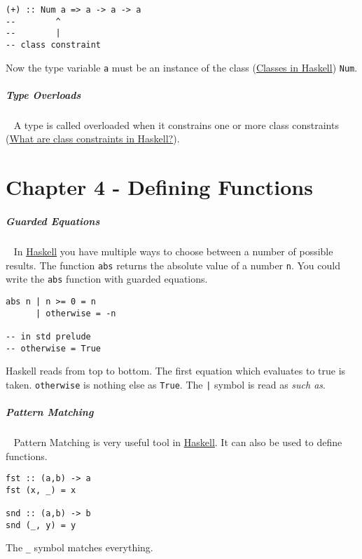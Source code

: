 \documentclass[11pt,twoside,landscape]{article}
\begin{document}
\begin{multicols}{3}
\lstset{language=haskell,label= ,caption= ,captionpos=b,numbers=none}
\begin{lstlisting}
(+) :: Num a => a -> a -> a
--        ^
--        |
-- class constraint
\end{lstlisting}

Now the type variable \texttt{a} must be an instance of the class (\href{../../../roam/20220217095852-classes_in_haskell.org}{Classes in Haskell}) \texttt{Num}.



\subparagraph{Type Overloads} \
\label{sec:org8a4bf32}
A type is called overloaded when it constrains one or more class constraints (\href{../../../roam/20220217095938-what_are_class_constraints_in_haskell.org}{What are class constraints in Haskell?}).

\section{Chapter 4 - Defining Functions}
\label{sec:org0694c70}
\subparagraph{Guarded Equations} \
\label{sec:orgca8cc8c}
In \href{../../../roam/20210618182407-haskell.org}{Haskell} you have multiple ways to choose between a number of possible results.
The function \texttt{abs} returns the absolute value of a number \texttt{n}.
You could write the \texttt{abs} function with guarded equations.

\lstset{language=haskell,label= ,caption= ,captionpos=b,numbers=none}
\begin{lstlisting}
abs n | n >= 0 = n
      | otherwise = -n

-- in std prelude
-- otherwise = True
\end{lstlisting}

Haskell reads from top to bottom.
The first equation which evaluates to true is taken.
\texttt{otherwise} is nothing else as \texttt{True}.
The \texttt{|} symbol is read as \emph{such as}.


\subparagraph{Pattern Matching} \
\label{sec:org81b2e9b}
Pattern Matching is very useful tool in \href{../../../roam/20210618182407-haskell.org}{Haskell}.
It can also be used to define functions.

\lstset{language=haskell,label= ,caption= ,captionpos=b,numbers=none}
\begin{lstlisting}
fst :: (a,b) -> a
fst (x, _) = x

snd :: (a,b) -> b
snd (_, y) = y
\end{lstlisting}

The \texttt{\_} symbol matches everything.


\end{multicols}
\end{document}

